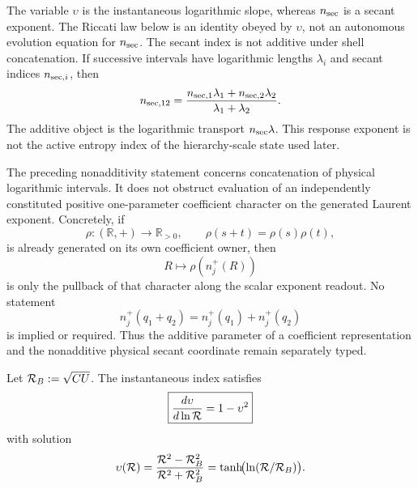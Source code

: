 \documentclass[12pt,a4paper]{article}
\begin{document}
\begin{remark}
\label{p3:rem:reduced_variables_status}
The variable \(\upsilon\) is the instantaneous logarithmic slope, whereas
\(n_{\rm sec}\) is a secant exponent.  The Riccati law below is an identity obeyed by
\(\upsilon\), not an autonomous evolution equation for \(n_{\rm sec}\).  The secant
index is not additive under shell concatenation.  If successive intervals
have logarithmic lengths \(\lambda_i\) and secant indices \(n_{{\rm sec},i}\), then
\[
 n_{{\rm sec},12}
 =\frac{n_{{\rm sec},1}\lambda_1+n_{{\rm sec},2}\lambda_2}
        {\lambda_1+\lambda_2}.
\]
The additive object is the logarithmic transport
\(n_{\rm sec}\lambda\).  This response exponent is not the active entropy
index of the hierarchy-scale state used later.
\end{remark}

\begin{remark}
\label{p3d:rem:v263-exponent-character-pullback}
The preceding nonadditivity statement concerns concatenation of physical
logarithmic intervals.  It does not obstruct evaluation of an independently
constituted positive one-parameter coefficient character on the generated
Laurent exponent.  Concretely, if
\[
 \rho:(\mathbb R,+)\longrightarrow\mathbb R_{>0},
 \qquad \rho(s+t)=\rho(s)\rho(t),
\]
is already generated on its own coefficient owner, then
\[
 R\longmapsto \rho\!\left(n_j^+(R)\right)
\]
is only the pullback of that character along the scalar exponent readout.
No statement
\[
 n_j^+(q_1+q_2)=n_j^+(q_1)+n_j^+(q_2)
\]
is implied or required.  Thus the additive parameter of a coefficient
representation and the nonadditive physical secant coordinate remain
separately typed.
\end{remark}

\begin{theorem}
\label{p3:thm:riccati}
Let \(\mathcal R_B:=\sqrt{CU}\).  The instantaneous index satisfies
\begin{equation}
\boxed{\frac{d\upsilon}{d\ln \mathcal R} = 1 - \upsilon^2}
\end{equation}
with solution
\begin{equation}
\label{p3:eq:upsilon_solution}
\upsilon(\mathcal R)
=\frac{\mathcal R^2-\mathcal R_B^2}{\mathcal R^2+\mathcal R_B^2}
=\tanh\!\bigl(\ln(\mathcal R/\mathcal R_B)\bigr).
\end{equation}
\end{theorem}
\end{document}
